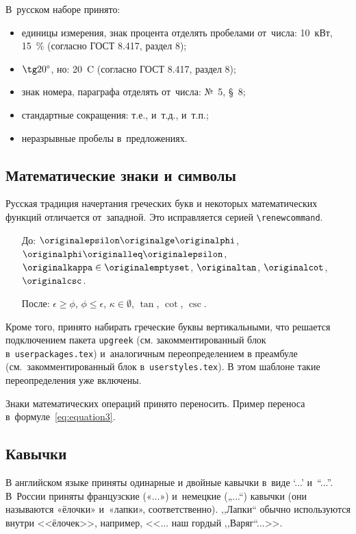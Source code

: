 В~русском наборе принято:
\begin{itemize}
    \item единицы измерения, знак процента отделять пробелами от~числа:
          10~кВт, 15~\% (согласно ГОСТ 8.417, раздел 8);
    \item \(\tg 20\text{\textdegree}\), но: 20~{\textdegree}C
          (согласно ГОСТ 8.417, раздел 8);
    \item знак номера, параграфа отделять от~числа: №~5, \S~8;
    \item стандартные сокращения: т.\:е., и~т.\:д., и~т.\:п.;
    \item неразрывные пробелы в~предложениях.
\end{itemize}

\subsection{Математические знаки и символы}

Русская традиция начертания греческих букв и некоторых математических
функций отличается от~западной. Это исправляется серией
\verb|\renewcommand|.
\begin{itemize}
    \item[До:] \( \originalepsilon \originalge \originalphi\),
          \(\originalphi \originalleq \originalepsilon\),
          \(\originalkappa \in \originalemptyset\),
          \(\originaltan\),
          \(\originalcot\),
          \(\originalcsc\).
    \item[После:] \( \epsilon \ge \phi\),
          \(\phi \leq \epsilon\),
          \(\kappa \in \emptyset\),
          \(\tan\),
          \(\cot\),
          \(\csc\).
\end{itemize}

Кроме того, принято набирать греческие буквы вертикальными, что
решается подключением пакета \verb|upgreek| (см. закомментированный
блок в~\verb|userpackages.tex|) и~аналогичным переопределением в
преамбуле (см.~закомментированный блок в~\verb|userstyles.tex|). В
этом шаблоне такие переопределения уже включены.

Знаки математических операций принято переносить. Пример переноса
в~формуле~\eqref{eq:equation3}.

\subsection{Кавычки}
В английском языке приняты одинарные и двойные кавычки в~виде ‘...’ и~“...”.
В~России приняты французские («...») и~немецкие („...“) кавычки (они называются
«ёлочки» и~«лапки», соответственно). ,,Лапки`` обычно используются внутри
<<ёлочек>>, например, <<... наш гордый ,,Варяг``...>>.

